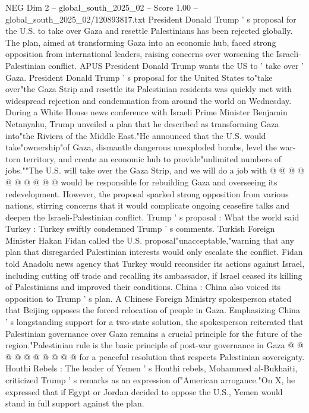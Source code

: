 \begin{textsample}{NEG Dim 2 – global\_south\_2025\_02 – Score 1.00 – global\_south\_2025\_02/120893817.txt}  \label{ex:f2_neg_021}
President Donald Trump ' s proposal for the U.S. to take over Gaza and resettle Palestinians has been rejected globally.
The plan, aimed at transforming Gaza into an economic hub, faced strong opposition from international leaders, raising concerns over worsening the Israeli-Palestinian conflict.
APUS President Donald Trump wants the US to ' take over ' Gaza.
President Donald Trump ' s proposal for the United States to"take over"the Gaza Strip and resettle its Palestinian residents was quickly met with widespread rejection and condemnation from around the world on Wednesday.
During a White House news conference with Israeli Prime Minister Benjamin Netanyahu, Trump unveiled a plan that he described as transforming Gaza into"the Riviera of the Middle East."He announced that the U.S. would take"ownership"of Gaza, dismantle dangerous unexploded bombs, level the war-torn territory, and create an economic hub to provide"unlimited numbers of jobs.""The U.S. will take over the Gaza Strip, and we will do a job with @ @ @ @ @ @ @ @ @ @ would be responsible for rebuilding Gaza and overseeing its redevelopment.
However, the proposal sparked strong opposition from various nations, stirring concerns that it would complicate ongoing ceasefire talks and deepen the Israeli-Palestinian conflict.
Trump ' s proposal : What the world said Turkey : Turkey swiftly condemned Trump ' s comments.
Turkish Foreign Minister Hakan Fidan called the U.S. proposal"unacceptable,"warning that any plan that disregarded Palestinian interests would only escalate the conflict.
Fidan told Anadolu news agency that Turkey would reconsider its actions against Israel, including cutting off trade and recalling its ambassador, if Israel ceased its killing of Palestinians and improved their conditions.
China : China also voiced its opposition to Trump ' s plan.
A Chinese Foreign Ministry spokesperson stated that Beijing opposes the forced relocation of people in Gaza.
Emphasizing China ' s longstanding support for a two-state solution, the spokesperson reiterated that Palestinian governance over Gaza remains a crucial principle for the future of the region."Palestinian rule is the basic principle of post-war governance in Gaza @ @ @ @ @ @ @ @ @ @ for a peaceful resolution that respects Palestinian sovereignty.
Houthi Rebels : The leader of Yemen ' s Houthi rebels, Mohammed al-Bukhaiti, criticized Trump ' s remarks as an expression of"American arrogance."On X, he expressed that if Egypt or Jordan decided to oppose the U.S., Yemen would stand in full support against the plan.

\end{textsample}
